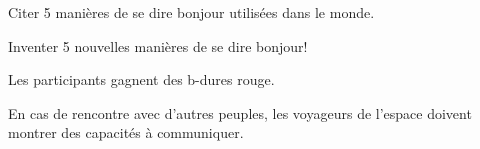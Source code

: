 \documentclass{grand-jeu}
\begin{document}
\begin{liste-materiel}
\end{liste-materiel}

\begin{regles}
Citer 5 manières de se dire bonjour utilisées dans le monde.

Inventer 5 nouvelles manières de se dire bonjour!

Les participants gagnent des b-dures rouge.

\end{regles}

\begin{imaginaire}
En cas de rencontre avec d'autres peuples, les voyageurs de l'espace doivent montrer des capacités à communiquer. 
\end{imaginaire}

\begin{moments-stop}
\end{moments-stop}
\end{document}
